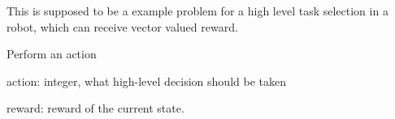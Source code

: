 \documentclass[letterpaper,10pt,english]{sphinxmanual}
\begin{document}
\begin{fulllineitems}
\label{Problems:morl_problems.MORLRobotActionPlanning}
This is supposed to be a example problem for a high level task selection
in a robot, which can receive vector valued reward.

\begin{fulllineitems}
\label{Problems:morl_problems.MORLRobotActionPlanning.play}
Perform an action

action: integer, what high-level decision should be taken

reward: reward of the current state.

\end{fulllineitems}


\end{fulllineitems}

\end{document}

